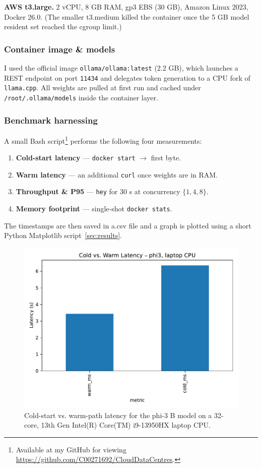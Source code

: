 \documentclass[conference]{IEEEtran}
\begin{document}
\textbf{AWS t3.large.} 2 vCPU, 8 GB RAM, gp3 EBS (30 GB), Amazon Linux 2023, Docker 26.0.  
(The smaller t3.medium killed the container once the 5 GB model
resident set reached the cgroup limit.)
\subsubsection*{Container image \& models}
I used the official image \texttt{ollama/ollama:latest} (2.2 GB), which launches a
REST endpoint on port \texttt{11434} and delegates token generation to a
CPU fork of \texttt{llama.cpp}.  
All weights are pulled at first run and cached under
\texttt{/root/.ollama/models} inside the container layer.
\subsubsection*{Benchmark harnessing}
A small Bash script\footnote{Available at my GitHub for viewing
\url{https://github.com/C00271692/CloudDataCentres}.}
performs the following four measurements:

\begin{enumerate}
  \item \textbf{Cold-start latency} — \texttt{docker start} $\rightarrow$ first byte.
  \item \textbf{Warm latency} — an additional \texttt{curl} once weights are in RAM.
  \item \textbf{Throughput \& P95} — \texttt{hey} for 30 s at concurrency $\{1,4,8\}$.
  \item \textbf{Memory footprint} — single-shot \texttt{docker stats}.
\end{enumerate}

The timestamps are then saved in a.csv file and a graph is plotted using a short Python Matplotlib script~\ref{sec:results}.

\begin{figure}[t]
  \centering
  \includegraphics[width=\linewidth]{latency_cold_warm}
  \caption{Cold-start vs. warm-path latency for the phi-3 B model on a 32-core, 13th Gen Intel(R) Core(TM) i9-13950HX laptop CPU.}
  \label{fig:latency}
\end{figure}
\end{document}
